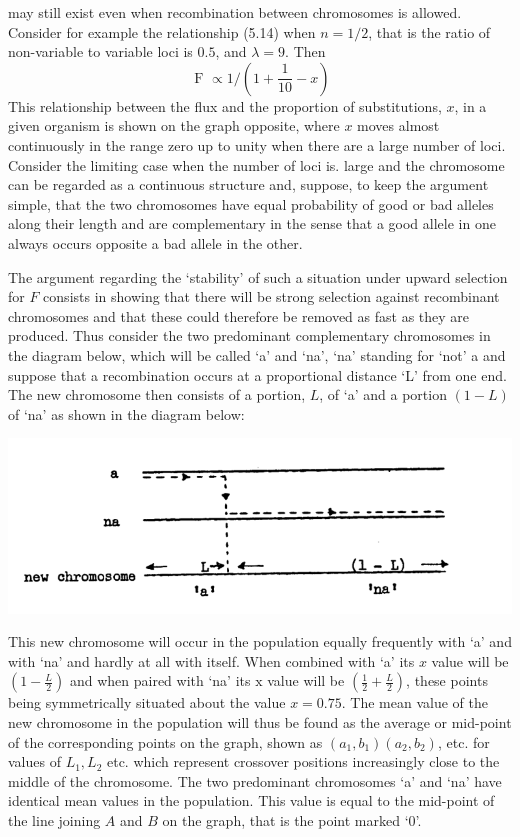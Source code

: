 may still exist even when recombination between chromosomes is allowed. Consider for example the relationship (5.14) when $n=1 / 2$, that is the ratio of non-variable to variable loci is $0.5$, and $\lambda=9$. Then
%
\begin{equation}
\text { F } \propto 1 /\left(1+\frac{1}{10}-x\right)
\label{eqn:517}
\end{equation}
%
This relationship between the flux and the proportion of substitutions, $x$, in a given organism is shown on the graph opposite, where $x$ moves almost continuously in the range zero up to unity when there are a large number of loci. Consider the limiting case when the number of loci is. large and the chromosome can be regarded as a continuous structure and, suppose, to keep the argument simple, that the two chromosomes have equal probability of good or bad alleles along their length and are complementary in the sense that a good allele in one always occurs opposite a bad allele in the other.

The argument regarding the `stability' of such a situation under upward selection for $F$ consists in showing that there will be strong selection against recombinant chromosomes and that these could therefore be removed as fast as they are produced. Thus consider the two predominant complementary chromosomes in the diagram below, which will be called `a' and `na', `na' standing for `not' a and suppose that a recombination occurs at a proportional distance `L' from one end. The new chromosome then consists of a portion, $L$, of `a' and a portion
$(1-L)$ of `na' as shown in the diagram below:

\begin{center}
\includegraphics[max width=\textwidth]{figure5_chrom.png}
\end{center}

This new chromosome will occur in the population equally frequently with `a' and with `na' and hardly at all with itself. When combined with `a' its $x$ value will be $\left(1-\frac{L}{2}\right)$ and when paired with `na' its $\mathrm{x}$ value will be $\left(\frac{1}{2}+\frac{L}{2}\right)$, these points being symmetrically situated about the value $x=0.75$. The mean value of the new chromosome in the population will thus be found as the average or mid-point of the corresponding points on the graph, shown as $\left(a_{1}, b_{1}\right)\left(a_{2}, b_{2}\right)$, etc. for values of $L_{1}, L_{2}$ etc. which represent crossover positions increasingly close to the middle of the chromosome. The two predominant chromosomes `a' and `na' have identical mean values in the population. This value is equal to the mid-point of the line joining $A$ and $B$ on the graph, that is the point marked `0'.

